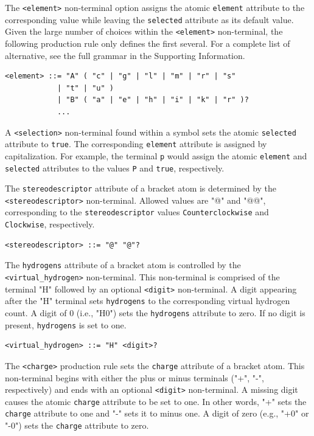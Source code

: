 \documentclass{article}
\def\ttt{\texttt}
\begin{document}
The \ttt{<element>} non-terminal option assigns the atomic \ttt{element} attribute to the corresponding value while leaving the \ttt{selected} attribute as its default value. Given the large number of choices within the \ttt{<element>} non-terminal, the following production rule only defines the first several. For a complete list of alternative, see the full grammar in the Supporting Information.

\begin{lstlisting}
<element> ::= "A" ( "c" | "g" | "l" | "m" | "r" | "s"
            | "t" | "u" )
            | "B" ( "a" | "e" | "h" | "i" | "k" | "r" )?
            ...
\end{lstlisting}

A \ttt{<selection>} non-terminal found within a symbol sets the atomic \ttt{selected} attribute to \ttt{true}. The corresponding \ttt{element} attribute is assigned by capitalization. For example, the terminal \ttt{p} would assign the atomic \ttt{element} and \ttt{selected} attributes to the values \ttt{P} and \ttt{true}, respectively.

The \ttt{stereodescriptor} attribute of a bracket atom is determined by the \ttt{<stereodescriptor>} non-terminal. Allowed values are "@" and "@@", corresponding to the \ttt{stereodescriptor} values \ttt{Counterclockwise} and \ttt{Clockwise}, respectively.

\begin{lstlisting}
<stereodescriptor> ::= "@" "@"?
\end{lstlisting}

The \ttt{hydrogens} attribute of a bracket atom is controlled by the \\ \ttt{<virtual{\_}hydrogen>} non-terminal. This non-terminal is comprised of the terminal "H" followed by an optional \ttt{<digit>} non-terminal. A digit appearing after the "H" terminal sets \ttt{hydrogens} to the corresponding virtual hydrogen count. A digit of 0 (i.e., "H0") sets the \ttt{hydrogens} attribute to zero. If no digit is present, \ttt{hydrogens} is set to one.

\begin{lstlisting}
<virtual_hydrogen> ::= "H" <digit>?
\end{lstlisting}

The \ttt{<charge>} production rule sets the \ttt{charge} attribute of a bracket atom. This non-terminal begins with either the plus or minus terminals ("+", "-", respectively) and ends with an optional \ttt{<digit>} non-terminal. A missing digit causes the atomic \ttt{charge} attribute to be set to one. In other words, "+" sets the \ttt{charge} attribute to one and "-" sets it to minus one. A digit of zero (e.g., "+0" or "-0") sets the \ttt{charge} attribute to zero.
\end{document}
